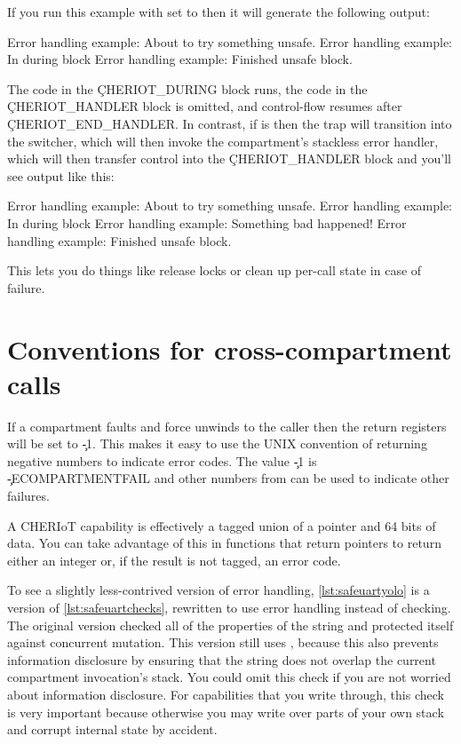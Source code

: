 If you run this example with  set to  then it will generate the following output:

\begin{console}
Error handling example: About to try something unsafe.
Error handling example: In during block
Error handling example: Finished unsafe block.
\end{console}

The code in the \c{CHERIOT_DURING} block runs, the code in the \c{CHERIOT_HANDLER} block is omitted, and control-flow resumes after \c{CHERIOT_END_HANDLER}.
In contrast, if  is  then the trap will transition into the switcher, which will then invoke the compartment's stackless error handler, which will then transfer control into the \c{CHERIOT_HANDLER} block and you'll see output like this:

\begin{console}
Error handling example: About to try something unsafe.
Error handling example: In during block
Error handling example: Something bad happened!
Error handling example: Finished unsafe block.
\end{console}

This lets you do things like release locks or clean up per-call state in case of failure.

\section{Conventions for cross-compartment calls}

If a compartment faults and force unwinds to the caller then the return registers will be set to \c{-1}.
This makes it easy to use the UNIX convention of returning negative numbers to indicate error codes.
The value \c{-1} is \c{-ECOMPARTMENTFAIL} and other numbers from  can be used to indicate other failures.

A CHERIoT capability is effectively a tagged union of a pointer and 64 bits of data.
You can take advantage of this in functions that return pointers to return either an integer or, if the result is not tagged, an error code.

To see a slightly less-contrived version of error handling, \ref{lst:safeuartyolo} is a version of \ref{lst:safeuartchecks}, rewritten to use error handling instead of checking.
The original version checked all of the properties of the string and protected itself against concurrent mutation.
This version still uses , because this also prevents information disclosure by ensuring that the string does not overlap the current compartment invocation's stack.
You could omit this check if you are not worried about information disclosure.
For capabilities that you write through, this check is very important because otherwise you may write over parts of your own stack and corrupt internal state by accident.

